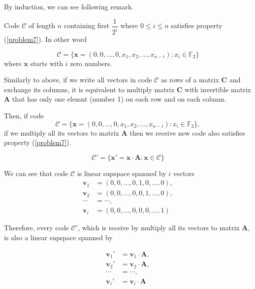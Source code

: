\documentclass{article}
\newcommand{\FF}{\mathbb{F}}
\begin{document}
By induction, we can see following remark.

\begin{remark}
    Code $\mathcal{C}$ of length $n$ containing first $\dfrac{1}{2^i}$ where $0 \leq i \leq n$ satisfies property (\ref{problem7}). In other word 
    
    \begin{equation}\label{linspace-i}
        \mathcal{C} = \{ \bm{x} = (0, 0, \ldots, 0, x_1, x_2, \ldots, x_{n-i}): x_i \in \FF_2 \}
    \end{equation} where $\bm{x}$ starts with $i$ zero numbers.
\end{remark}

Similarly to above, if we write all vectors in code $\mathcal{C}$ as rows of a matrix $\bm{C}$ and exchange its columns, it is equivalent to multiply matrix $\bm{C}$ with invertible matrix $\bm{A}$ that has only one elemnt (number 1) on each row and on each column.

Then, if code \[ \mathcal{C} = \{ \bm{x} = (0, 0, \ldots, 0, x_1, x_2, \ldots, x_{n-i}): x_i \in \FF_2 \}, \] if we multiply all its vectors to matrix $\bm{A}$ then we receive new code also satisfies property (\ref{problem7}).

\begin{equation*}
    \mathcal{C}' = \{ \bm{x}' = \bm{x} \cdot \bm{A}: \bm{x} \in \mathcal{C} \}
\end{equation*}

We can see that code $\mathcal{C}$ is linear supspace spanned by $i$ vectors 
\begin{align*}
    \bm{v}_1 & = (0, 0, \ldots, 0, 1, 0, \ldots, 0), \\
    \bm{v}_2 & = (0, 0, \ldots, 0, 0, 1, \ldots, 0), \\
    \cdots & = \cdots, \\
    \bm{v}_i & = (0, 0, \ldots, 0, 0, 0, \ldots, 1)
\end{align*}

Therefore, every code $\mathcal{C}'$, which is receive by multiply all its vectors to matrix $\bm{A}$, is also a linear supspace spanned by 

\begin{align*}
    \bm{v}_1' & = \bm{v}_1 \cdot \bm{A}, \\
    \bm{v}_2' & = \bm{v}_2 \cdot \bm{A}, \\
    \cdots & = \cdots, \\
    \bm{v}_i' & = \bm{v}_i \cdot \bm{A}
\end{align*}
\end{document}
